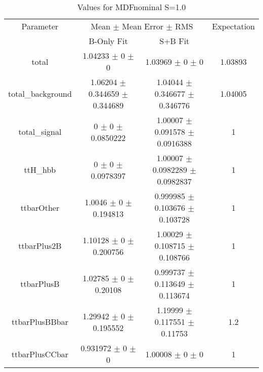 \begin{table}
\centering
\caption{Values for MDFnominal S=1.0}
\begin{tabular}{cccc}
\toprule
Parameter & \multicolumn{2}{c}{Mean $\pm$ Mean Error $\pm$ RMS} & Expectation\\
 & B-Only Fit & S+B Fit & \\
\midrule
total & \num{1.04233} $\pm$ \num{0} $\pm$ \num{0} & \num{1.03969} $\pm$ \num{0} $\pm$ \num{0} & \num{1.03893}\\
total\_background & \num{1.06204} $\pm$ \num{0.344659} $\pm$ \num{0.344689} & \num{1.04044} $\pm$ \num{0.346677} $\pm$ \num{0.346776} & \num{1.04005}\\
total\_signal & \num{0} $\pm$ \num{0} $\pm$ \num{0.0850222} & \num{1.00007} $\pm$ \num{0.091578} $\pm$ \num{0.0916388} & \num{1}\\
ttH\_hbb & \num{0} $\pm$ \num{0} $\pm$ \num{0.0978397} & \num{1.00007} $\pm$ \num{0.0982289} $\pm$ \num{0.0982837} & \num{1}\\
ttbarOther & \num{1.0046} $\pm$ \num{0} $\pm$ \num{0.194813} & \num{0.999985} $\pm$ \num{0.103676} $\pm$ \num{0.103728} & \num{1}\\
ttbarPlus2B & \num{1.10128} $\pm$ \num{0} $\pm$ \num{0.200756} & \num{1.00029} $\pm$ \num{0.108715} $\pm$ \num{0.108766} & \num{1}\\
ttbarPlusB & \num{1.02785} $\pm$ \num{0} $\pm$ \num{0.20108} & \num{0.999737} $\pm$ \num{0.113649} $\pm$ \num{0.113674} & \num{1}\\
ttbarPlusBBbar & \num{1.29942} $\pm$ \num{0} $\pm$ \num{0.195552} & \num{1.19999} $\pm$ \num{0.117551} $\pm$ \num{0.11753} & \num{1.2}\\
ttbarPlusCCbar & \num{0.931972} $\pm$ \num{0} $\pm$ \num{0} & \num{1.00008} $\pm$ \num{0} $\pm$ \num{0} & \num{1}\\
\bottomrule
\end{tabular}
\end{table}